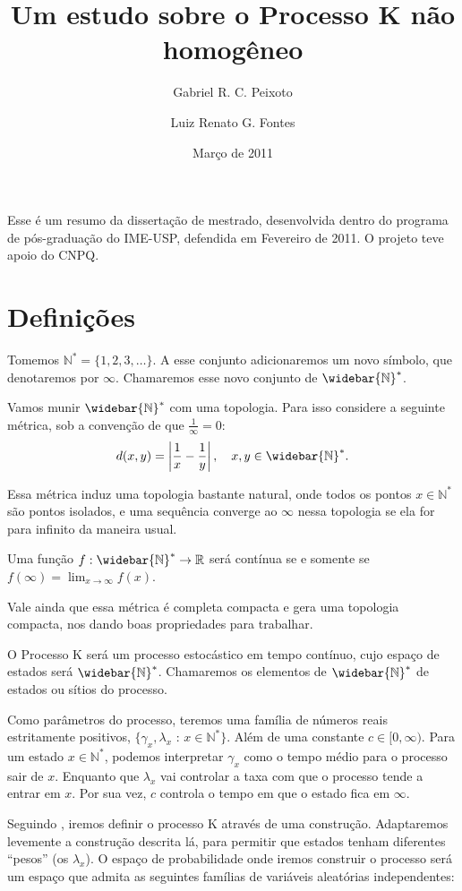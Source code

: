\documentclass[11pt,twoside,a4paper]{article}
\title{Um estudo sobre o Processo K não homogêneo}
\author{
  Gabriel R. C. Peixoto
  \and
  Luiz Renato G. Fontes
}
\date{Março de 2011}
\newcommand{\Nz}{{\mathbb{N^*}}}
\newcommand{\Nzb}{{\mathbb{\widebar{N}^*}}}
\newcommand{\R}{{\mathbb{R}}}
\begin{document}
\maketitle

Esse é um resumo da dissertação de mestrado, desenvolvida dentro do
programa de pós-graduação do IME-USP, defendida em Fevereiro de 2011.
O projeto teve apoio do CNPQ.

\section{Definições}
\label{sec:definicoes}

Tomemos $\Nz = \{ 1, 2, 3, \ldots\}$. A esse conjunto adicionaremos um
novo símbolo, que denotaremos por $\infty$. Chamaremos esse novo
conjunto de $\Nzb$.


Vamos munir $\Nzb$ com uma topologia. Para isso considere a
seguinte métrica, sob a convenção de que $\frac{1}{\infty} = 0$:
\begin{equation}
  \label{eq:metrica}
  d(x, y) = \left\lvert \frac{1}{x} - \frac{1}{y} \right\rvert,
  \quad x, y \in \Nzb.
\end{equation}


Essa métrica induz uma topologia bastante natural, onde todos os
pontos $x \in \Nz$ são pontos isolados, e uma sequência converge ao
$\infty$ nessa topologia se ela for para infinito da maneira
usual.

Uma função $f: \Nzb \to \R$ será contínua se e somente se
$f(\infty) = \lim_{x \to \infty} f(x)$.

Vale ainda que essa métrica é completa compacta e gera uma topologia
compacta, nos dando boas propriedades para trabalhar.

O Processo K será um processo estocástico em tempo contínuo, cujo
espaço de estados será $\Nzb$. Chamaremos os elementos de $\Nzb$ de
estados ou sítios do processo.

Como parâmetros do processo, teremos uma família de números reais
estritamente positivos, $\{ \gamma_x, \lambda_x$ : $x \in \Nz\}$. Além
de uma constante $c \in [0, \infty)$.  Para um estado $x \in \Nz$,
podemos interpretar $\gamma_x$ como o tempo médio para o processo sair
de $x$. Enquanto que $\lambda_x$ vai controlar a taxa com que o
processo tende a entrar em $x$. Por sua vez, $c$ controla o tempo em
que o estado fica em $\infty$.

Seguindo \cite{fontes:08}, iremos definir o processo K através de uma
construção. Adaptaremos levemente a construção descrita lá, para
permitir que estados tenham diferentes ``pesos'' (os $\lambda_x$).  O
espaço de probabilidade onde iremos construir o processo será um
espaço que admita as seguintes famílias de variáveis aleatórias
independentes:
\end{document}
